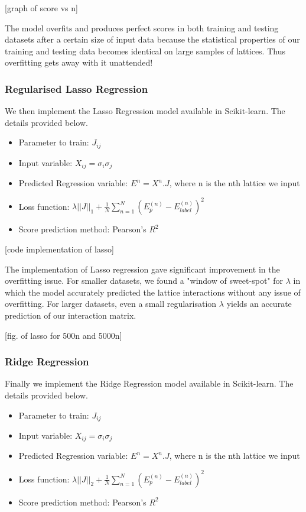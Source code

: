 [graph of score vs n]

The model overfits and produces perfect scores in both training and testing datasets after a certain size of input data because the statistical properties of our training and testing data becomes identical on large samples of lattices. Thus overfitting gets away with it unattended!

\subsubsection{Regularised Lasso Regression}
We then implement the Lasso Regression model available in Scikit-learn. The details provided below.
\begin{itemize}
    \item Parameter to train: \(J_{ij}\)
    \item Input variable: \(X_{ij}=\sigma_i\sigma_j\)
    \item Predicted Regression variable: \(E^n=X^n.J\), where n is the nth lattice we input
    \item Loss function: \(\lambda ||J||_1 + \frac{1}{N} \sum_{n=1}^N(E_p^{(n)}-E_{label}^{(n)})^2\)
    \item Score prediction method: Pearson's \(R^2\)
\end{itemize}

[code implementation of lasso]

The implementation of Lasso regression gave significant improvement in the overfitting issue. For smaller datasets, we found a "window of sweet-spot" for \(\lambda\) in which the model accurately predicted the lattice interactions without any issue of overfitting. For larger datasets, even a small regularisation \(\lambda\) yields an accurate prediction of our interaction matrix.

[fig. of lasso for 500n and 5000n]

\subsubsection{Ridge Regression}
Finally we implement the Ridge Regression model available in Scikit-learn. The details provided below.
\begin{itemize}
    \item Parameter to train: \(J_{ij}\)
    \item Input variable: \(X_{ij}=\sigma_i\sigma_j\)
    \item Predicted Regression variable: \(E^n=X^n.J\), where n is the nth lattice we input
    \item Loss function: \(\lambda ||J||_2 + \frac{1}{N} \sum_{n=1}^N(E_p^{(n)}-E_{label}^{(n)})^2\)
    \item Score prediction method: Pearson's \(R^2\)
\end{itemize}

